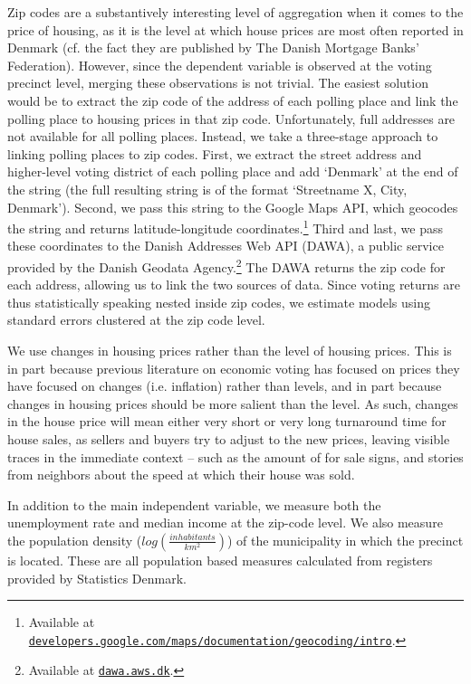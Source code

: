 \documentclass[12pt,a4paper]{article}
\begin{document}
Zip codes are a substantively interesting level of aggregation when it comes to the price of housing, as it is the level at which house prices are most often reported in Denmark (cf. the fact they are published by The Danish Mortgage Banks' Federation). However, since the dependent variable is observed at the voting precinct level, merging these observations is not trivial. The easiest solution would be to extract the zip code of the address of each polling place and link the polling place to housing prices in that zip code. Unfortunately, full addresses are not available for all polling places. Instead, we take a three-stage approach to linking polling places to zip codes. First, we extract the street address and higher-level voting district of each polling place and add `Denmark' at the end of the string (the full resulting string is of the format `Streetname X, City, Denmark'). Second, we pass this string to the Google Maps API, which geocodes the string and returns latitude-longitude coordinates.\footnote{Available at \texttt{\href{https://developers.google.com/maps/documentation/geocoding/intro}{developers.google.com/maps/documentation/geocoding/intro}}.} Third and last, we pass these coordinates to the Danish Addresses Web API (DAWA), a public service provided by the Danish Geodata Agency.\footnote{Available at \texttt{\href{http://dawa.aws.dk/}{dawa.aws.dk}}.} The DAWA returns the zip code for each address, allowing us to link the two sources of data. Since voting returns are thus statistically speaking nested inside zip codes, we estimate models using standard errors clustered at the zip code level.

We use changes in housing prices rather than the level of housing prices. This is in part because previous literature on economic voting has focused on prices they have focused on changes (i.e. inflation) rather than levels, and in part because changes in housing prices should be more salient than the level. As such, changes in the house price will mean either very short or very long turnaround time for house sales, as sellers and buyers try to adjust to the new prices, leaving visible traces in the immediate context -- such as the amount of for sale signs, and stories from neighbors about the speed at which their house was sold.

In addition to the main independent variable, we measure both the unemployment rate and median income at the zip-code level. We also measure the population density ($log(\frac{inhabitants}{km^2})$) of the municipality in which the precinct is located. These are all population based measures calculated from registers provided by Statistics Denmark. 
\end{document}
